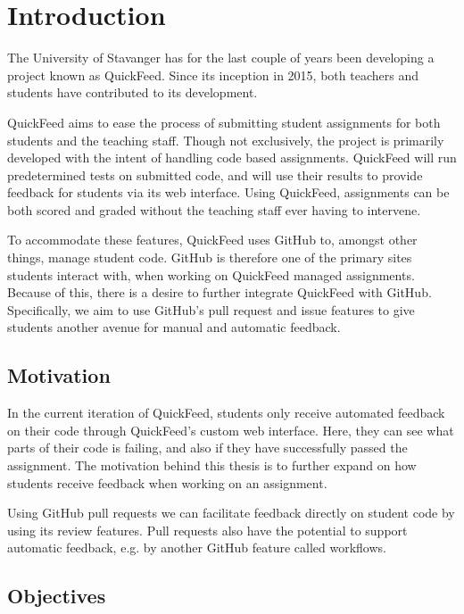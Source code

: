 
\chapter{Introduction}
\label{ch:intro}

The University of Stavanger has for the last couple of years been developing a project known as QuickFeed.
Since its inception in 2015, both teachers and students have contributed to its development. %

QuickFeed aims to ease the process of submitting student assignments for both students and the teaching staff.
Though not exclusively, the project is primarily developed with the intent of handling code based assignments.
QuickFeed will run predetermined tests on submitted code, and will use their results to provide feedback for students via its web interface.
Using QuickFeed, assignments can be both scored and graded without the teaching staff ever having to intervene.

To accommodate these features, QuickFeed uses GitHub to, amongst other things, manage student code.
GitHub is therefore one of the primary sites students interact with, when working on QuickFeed managed assignments.
Because of this, there is a desire to further integrate QuickFeed with GitHub.
Specifically, we aim to use GitHub's pull request and issue features to give students another avenue for manual and automatic feedback.

\section{Motivation}
\label{sec:motivation}

In the current iteration of QuickFeed, students only receive automated feedback on their code through QuickFeed's custom web interface.
Here, they can see what parts of their code is failing, and also if they have successfully passed the assignment.
The motivation behind this thesis is to further expand on how students receive feedback when working on an assignment.

Using GitHub pull requests we can facilitate feedback directly on student code by using its review features.
Pull requests also have the potential to support automatic feedback, e.g. by another GitHub feature called workflows.

\section{Objectives}

